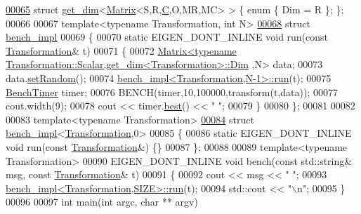 \begin{DoxyCode}
\hyperlink{structget__dim_3_01_matrix_3_01_s_00_01_r_00_01_c_00_01_o_00_01_m_r_00_01_m_c_01_4_01_4}{00065} \textcolor{keyword}{struct }\hyperlink{structget__dim}{get\_dim}<\hyperlink{group___core___module_class_eigen_1_1_matrix}{Matrix}<S,R,\hyperlink{group___core___module}{C},O,MR,MC> > \{ \textcolor{keyword}{enum} \{ Dim = R \}; \};
00066 
00067 \textcolor{keyword}{template}<\textcolor{keyword}{typename} Transformation, \textcolor{keywordtype}{int} N>
\hyperlink{structbench__impl}{00068} \textcolor{keyword}{struct }\hyperlink{structbench__impl}{bench\_impl}
00069 \{
00070   \textcolor{keyword}{static} EIGEN\_DONT\_INLINE \textcolor{keywordtype}{void} run(\textcolor{keyword}{const} \hyperlink{class_transformation}{Transformation}& t)
00071   \{
00072     \hyperlink{group___core___module_class_eigen_1_1_matrix}{Matrix<typename Transformation::Scalar,get\_dim<Transformation>::Dim}
      ,N> data;
00073     data.\hyperlink{class_eigen_1_1_plain_object_base_af0e576a0e1aefc9ee346de44cc352ba3}{setRandom}();
00074     \hyperlink{structbench__impl}{bench\_impl<Transformation,N-1>::run}(t);
00075     \hyperlink{class_eigen_1_1_bench_timer}{BenchTimer} timer;
00076     BENCH(timer,10,100000,transform(t,data));
00077     cout.width(9);
00078     cout << timer.\hyperlink{class_eigen_1_1_bench_timer_ae8b673b0fa356d3432c7a65c79e8af0e}{best}() << \textcolor{stringliteral}{" "};
00079   \}
00080 \};
00081 
00082 
00083 \textcolor{keyword}{template}<\textcolor{keyword}{typename} Transformation>
\hyperlink{structbench__impl_3_01_transformation_00_010_01_4}{00084} \textcolor{keyword}{struct }\hyperlink{structbench__impl}{bench\_impl}<\hyperlink{class_transformation}{Transformation},0>
00085 \{
00086   \textcolor{keyword}{static} EIGEN\_DONT\_INLINE \textcolor{keywordtype}{void} run(\textcolor{keyword}{const} \hyperlink{class_transformation}{Transformation}&) \{\}
00087 \};
00088 
00089 \textcolor{keyword}{template}<\textcolor{keyword}{typename} Transformation>
00090 EIGEN\_DONT\_INLINE \textcolor{keywordtype}{void} bench(\textcolor{keyword}{const} std::string& msg, \textcolor{keyword}{const} \hyperlink{class_transformation}{Transformation}& t)
00091 \{
00092   cout << msg << \textcolor{stringliteral}{" "};
00093   \hyperlink{structbench__impl}{bench\_impl<Transformation,SIZE>::run}(t);
00094   std::cout << \textcolor{stringliteral}{"\(\backslash\)n"};
00095 \}
00096 
00097 \textcolor{keywordtype}{int} main(\textcolor{keywordtype}{int} argc, \textcolor{keywordtype}{char} ** argv)

\end{DoxyCode}
